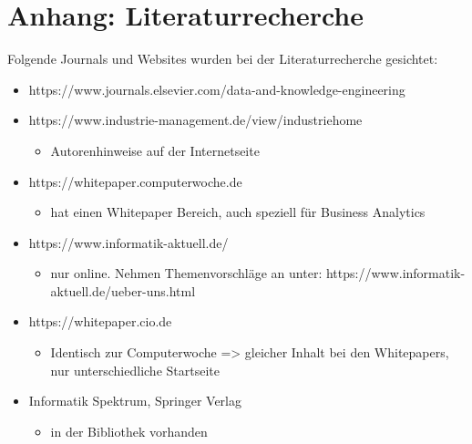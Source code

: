 \chapter{Anhang: Literaturrecherche}
\label{attachement:literature-research}

Folgende Journals und Websites wurden bei der Literaturrecherche gesichtet:
\begin{itemize}
	\item https://www.journals.elsevier.com/data-and-knowledge-engineering
	\item https://www.industrie-management.de/view/industriehome
		\begin{itemize}
			\item Autorenhinweise auf der Internetseite
		\end{itemize}
	\item https://whitepaper.computerwoche.de
		\begin{itemize}
			\item hat einen Whitepaper Bereich, auch speziell für Business Analytics
		\end{itemize}
	\item https://www.informatik-aktuell.de/
		\begin{itemize}
			\item nur online. Nehmen Themenvorschläge an unter: https://www.informatik-aktuell.de/ueber-uns.html
		\end{itemize}
	\item https://whitepaper.cio.de
		\begin{itemize}
			\item Identisch zur Computerwoche => gleicher Inhalt bei den Whitepapers, nur unterschiedliche Startseite
		\end{itemize}
	\item Informatik Spektrum, Springer Verlag
		\begin{itemize}
			\item in der Bibliothek vorhanden
		\end{itemize}
\end{itemize}